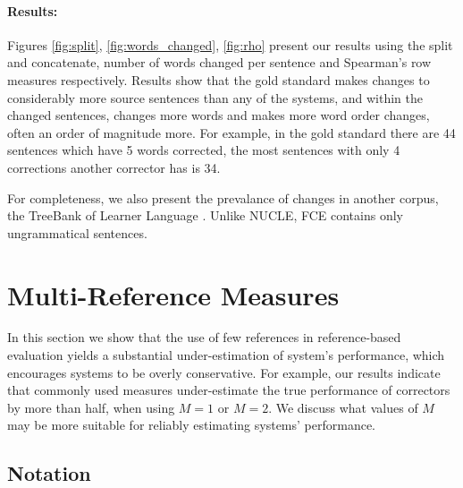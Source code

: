\documentclass[letter,11pt]{article}
\begin{document}
\paragraph{Results:}
Figures \ref{fig:split}, \ref{fig:words_changed}, \ref{fig:rho} present our results using the split and concatenate, number of words changed per sentence and Spearman's row measures respectively.
Results show that the gold standard makes changes to considerably more source sentences than any of the systems, and within the changed sentences, changes more words and makes more word order changes, often an order of magnitude more. For example, in the gold standard there are 44 sentences which have 5 words corrected, the most sentences with only 4 corrections another corrector has is 34.

For completeness, we also present the prevalance of changes in another
corpus, the TreeBank of Learner Language \cite[FCE]{berzak2016universal}.
Unlike NUCLE, FCE contains only ungrammatical sentences.



\section{Multi-Reference Measures}\label{sec:increase-reference}

In this section we show that the use of few references in reference-based evaluation yields
a substantial under-estimation of system's performance, which encourages systems
to be overly conservative.
For example, our results indicate that commonly used measures under-estimate the true performance
of correctors by more than half, when using $M=1$ or $M=2$.
We discuss what values of $M$ may be more suitable for reliably estimating systems' performance.



\subsection{Notation}
\end{document}
